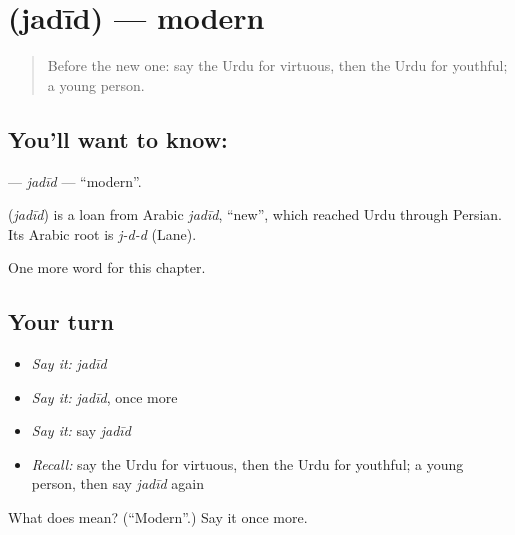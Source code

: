 \section[\texorpdfstring{\ur{جدید} (jadīd)}{جدید (jadīd)}]{ (jadīd) — modern}

\label{lesson:UR-C196-jadid}



\begin{quote}
Before the new one: say the Urdu for virtuous, then the Urdu for youthful; a young person.
\end{quote}

\subsection*{You'll want to know: }
\textbf{} — \emph{jadīd} — \textquotedblleft{}modern\textquotedblright{}.

\begin{cousinweb}
\textbf{} (\emph{jadīd}) is a loan from Arabic \emph{jadīd}, \textquotedblleft{}new\textquotedblright{}, which reached Urdu through Persian. Its Arabic root is \emph{j-d-d} (Lane).
\end{cousinweb}

\begin{grammarlens}[title={What you've built}]
One more word for this chapter.
\end{grammarlens}

\subsection*{Your turn}
\begin{itemize}
\raggedright
  \item \emph{Say it:} \emph{jadīd}
  \item \emph{Say it:} \emph{jadīd}, once more
  \item \emph{Say it:} say \emph{jadīd}
  \item \emph{Recall:} say the Urdu for virtuous, then the Urdu for youthful; a young person, then say \emph{jadīd} again
\end{itemize}

\begin{tcolorbox}[breakable,colback=teal!4,colframe=teal!35!black,title={Before you move on}]
What does  mean? (\textquotedblleft{}Modern\textquotedblright{}.) Say it once more.
\end{tcolorbox}
